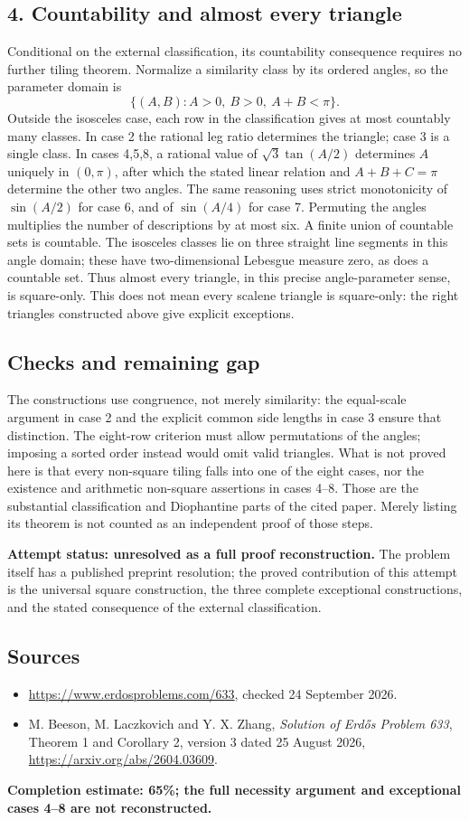 \subsection*{4. Countability and almost every triangle}
Conditional on the external classification, its countability consequence requires no further tiling theorem. Normalize a similarity class by its ordered angles, so the parameter domain is
\[
 \{(A,B):A>0,\ B>0,\ A+B<\pi\}.
\]
Outside the isosceles case, each row in the classification gives at most countably many classes. In case 2 the rational leg ratio determines the triangle; case 3 is a single class. In cases 4,5,8, a rational value of $\sqrt3\tan(A/2)$ determines $A$ uniquely in $(0,\pi)$, after which the stated linear relation and $A+B+C=\pi$ determine the other two angles. The same reasoning uses strict monotonicity of $\sin(A/2)$ for case 6, and of $\sin(A/4)$ for case 7. Permuting the angles multiplies the number of descriptions by at most six. A finite union of countable sets is countable.
The isosceles classes lie on three straight line segments in this angle domain; these have two-dimensional Lebesgue measure zero, as does a countable set. Thus almost every triangle, in this precise angle-parameter sense, is square-only. This does not mean every scalene triangle is square-only: the right triangles constructed above give explicit exceptions.

\subsection*{Checks and remaining gap}
The constructions use congruence, not merely similarity: the equal-scale argument in case 2 and the explicit common side lengths in case 3 ensure that distinction. The eight-row criterion must allow permutations of the angles; imposing a sorted order instead would omit valid triangles.
What is not proved here is that every non-square tiling falls into one of the eight cases, nor the existence and arithmetic non-square assertions in cases 4--8. Those are the substantial classification and Diophantine parts of the cited paper. Merely listing its theorem is not counted as an independent proof of those steps.

\textbf{Attempt status: unresolved as a full proof reconstruction.} The problem itself has a published preprint resolution; the proved contribution of this attempt is the universal square construction, the three complete exceptional constructions, and the stated consequence of the external classification.

\subsection*{Sources}
\begin{itemize}
\item \url{https://www.erdosproblems.com/633}, checked 24 September 2026.
\item M. Beeson, M. Laczkovich and Y. X. Zhang, \emph{Solution of Erd\H{o}s Problem 633}, Theorem 1 and Corollary 2, version 3 dated 25 August 2026, \url{https://arxiv.org/abs/2604.03609}.
\end{itemize}
\noindent\textbf{Completion estimate: 65\%; the full necessity argument and exceptional cases 4--8 are not reconstructed.}
